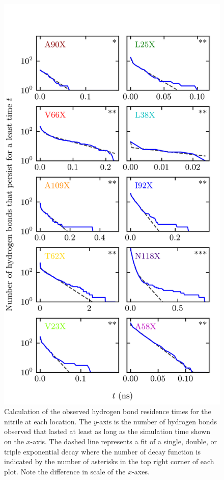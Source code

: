 \begin{figure}
    \center
    \includegraphics[width=\single]{figures-snase/Lifetimes.png}
    \caption[]{
        Calculation of the observed hydrogen bond residence times for the nitrile at each location. 
        The $y$-axis is the number of hydrogen bonds observed that lasted at least as long as the simulation time shown on the $x$-axis. 
        The dashed line represents a fit of a single, double, or triple exponential decay where the number of decay function is indicated by the number of asterisks in the top right corner of each plot. 
        Note the difference in scale of the $x$-axes.
    }
    \label{fig:snase-lifetimes}
\end{figure}

